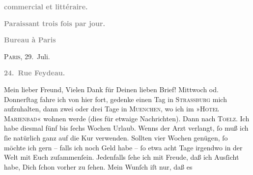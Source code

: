 \begin{ledgroupsized}[t]{13cm}
           \pstart
           \begin{otherlanguage}{french}\textcolor{gray}{\textbf{commercial et littéraire.}}\end{otherlanguage}\pend
           \pstart
           \begin{otherlanguage}{french}\textcolor{gray}{\textbf{\textbf{Paraissant trois fois par jour.}}}\end{otherlanguage}\pend
           \pstart
           \begin{otherlanguage}{french}\textcolor{gray}{\textbf{\textbf{Bureau à Paris}}}\end{otherlanguage}\hfill \textsc{Paris}, 29. Juli.\pend
           \pstart
           \begin{otherlanguage}{french}\textcolor{gray}{\textbf{\textbf{24. Rue Feydeau.}}}\end{otherlanguage}\pend
           \pstart\center{}Mein lieber Freund,\pend\pstart
           Vielen Dank für Deinen lieben Brief! \pend
           \pstart
           Mittwoch od. Donnerſtag
               fahre ich von hier fort, gedenke einen Tag in \textsc{Strassburg} mich aufzuhalten, dann zwei oder drei Tage in \textsc{Muenchen}, wo ich im »\textsc{Hotel Marienbad}« wohnen werde (dies für etwaige Nachrichten). Dann nach \textsc{Toelz}. Ich habe diesmal {\pb}fünf bis ſechs Wochen
               Urlaub. Wenns der Arzt verlangt, ſo muß ich ſie natürlich ganz auf die Kur verwenden.
               Sollten vier Wochen genügen, ſo möchte ich gern – falls ich noch Geld habe – ſo etwa
               acht Tage irgendwo in der Welt mit Euch zuſammenſein. Jedenfalls ſehe ich mit Freude,
               daß ich Ausſicht habe, Dich ſchon vorher zu ſehen. Mein Wunſch iſt nur, daß es

\end{ledgroupsized}

